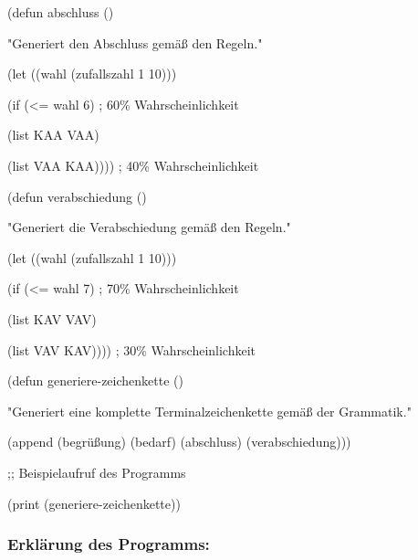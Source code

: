 \documentclass[
]{article}
\begin{document}
(defun abschluss ()

"Generiert den Abschluss gemäß den Regeln."

(let ((wahl (zufallszahl 1 10)))

(if (\textless= wahl 6) ; 60\% Wahrscheinlichkeit

(list \textquotesingle KAA \textquotesingle VAA)

(list \textquotesingle VAA \textquotesingle KAA)))) ; 40\%
Wahrscheinlichkeit

(defun verabschiedung ()

"Generiert die Verabschiedung gemäß den Regeln."

(let ((wahl (zufallszahl 1 10)))

(if (\textless= wahl 7) ; 70\% Wahrscheinlichkeit

(list \textquotesingle KAV \textquotesingle VAV)

(list \textquotesingle VAV \textquotesingle KAV)))) ; 30\%
Wahrscheinlichkeit

(defun generiere-zeichenkette ()

"Generiert eine komplette Terminalzeichenkette gemäß der Grammatik."

(append (begrüßung) (bedarf) (abschluss) (verabschiedung)))

;; Beispielaufruf des Programms

(print (generiere-zeichenkette))

\subsubsection{\texorpdfstring{\textbf{Erklärung des
Programms:}}{Erklärung des Programms:}}\label{erkluxe4rung-des-programms-1}
\end{document}
